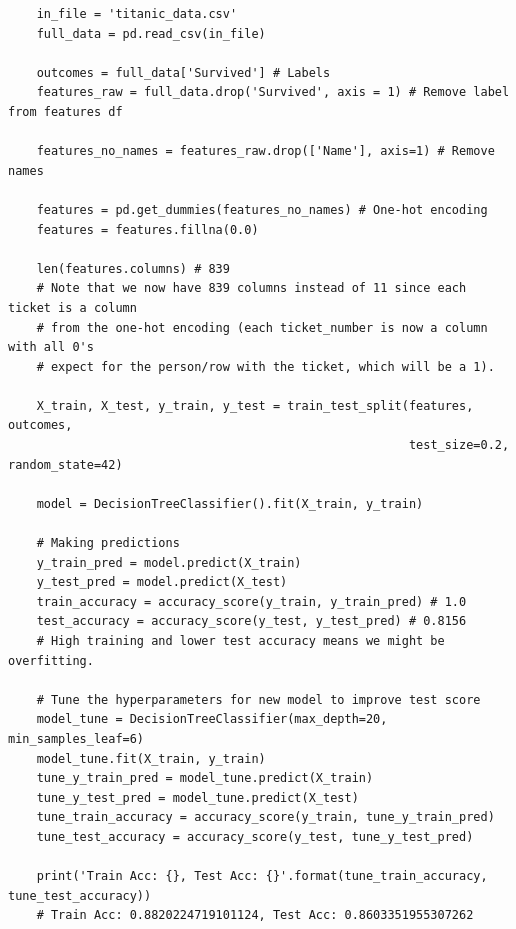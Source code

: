 \documentclass[11pt, a4paper]{article}
\begin{document}
\begin{spacing}{1.1}
\begin{lstlisting}
	in_file = 'titanic_data.csv'
	full_data = pd.read_csv(in_file)
	
	outcomes = full_data['Survived'] # Labels
	features_raw = full_data.drop('Survived', axis = 1) # Remove label from features df
	
	features_no_names = features_raw.drop(['Name'], axis=1) # Remove names
	
	features = pd.get_dummies(features_no_names) # One-hot encoding
	features = features.fillna(0.0)
	
	len(features.columns) # 839
	# Note that we now have 839 columns instead of 11 since each ticket is a column
	# from the one-hot encoding (each ticket_number is now a column with all 0's 
	# expect for the person/row with the ticket, which will be a 1).
	
	X_train, X_test, y_train, y_test = train_test_split(features, outcomes, 
	                                                    test_size=0.2, random_state=42)
	
	model = DecisionTreeClassifier().fit(X_train, y_train)
	
	# Making predictions
	y_train_pred = model.predict(X_train)
	y_test_pred = model.predict(X_test)
	train_accuracy = accuracy_score(y_train, y_train_pred) # 1.0
	test_accuracy = accuracy_score(y_test, y_test_pred) # 0.8156
	# High training and lower test accuracy means we might be overfitting.
	
	# Tune the hyperparameters for new model to improve test score
	model_tune = DecisionTreeClassifier(max_depth=20, min_samples_leaf=6)
	model_tune.fit(X_train, y_train)
	tune_y_train_pred = model_tune.predict(X_train)
	tune_y_test_pred = model_tune.predict(X_test)
	tune_train_accuracy = accuracy_score(y_train, tune_y_train_pred)
	tune_test_accuracy = accuracy_score(y_test, tune_y_test_pred) 
	
	print('Train Acc: {}, Test Acc: {}'.format(tune_train_accuracy, tune_test_accuracy))
	# Train Acc: 0.8820224719101124, Test Acc: 0.8603351955307262 \end{lstlisting} \newpage


\end{spacing}
\end{document}
